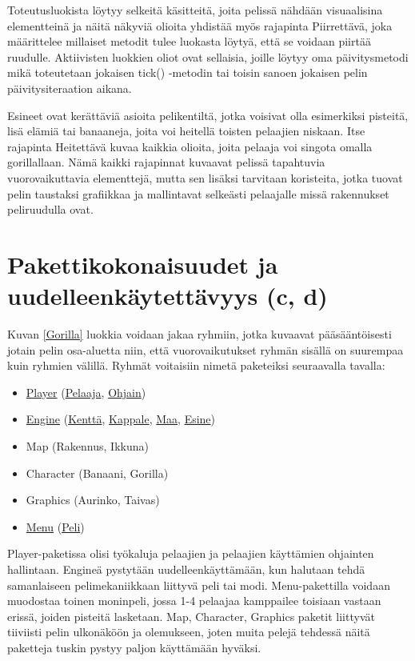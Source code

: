 Toteutusluokista löytyy selkeitä käsitteitä, joita pelissä nähdään visuaalisina
elementteinä ja näitä näkyviä olioita yhdistää myös rajapinta Piirrettävä, joka
määrittelee millaiset metodit tulee luokasta löytyä, että se voidaan piirtää
ruudulle. Aktiivisten luokkien oliot ovat sellaisia, joille löytyy oma
päivitysmetodi mikä toteutetaan jokaisen tick() -metodin tai toisin sanoen
jokaisen pelin päivitysiteraation aikana. 

Esineet ovat kerättäviä asioita pelikentiltä, jotka voisivat olla esimerkiksi
pisteitä, lisä elämiä tai banaaneja, joita voi heitellä toisten pelaajien niskaan. Itse rajapinta
Heitettävä kuvaa kaikkia olioita, joita pelaaja voi singota omalla gorillallaan.
Nämä kaikki rajapinnat kuvaavat pelissä tapahtuvia vuorovaikuttavia elementtejä,
mutta sen lisäksi tarvitaan koristeita, jotka tuovat pelin taustaksi grafiikkaa
ja mallintavat selkeästi pelaajalle missä rakennukset peliruudulla ovat.

\section{Pakettikokonaisuudet ja uudelleenkäytettävyys (c, d)}

\label{Pakettikokonaisuudet ja uudelleenkäytettävyys (c, d)}

Kuvan \ref{Gorilla} luokkia voidaan jakaa ryhmiin, jotka kuvaavat
pääsääntöisesti jotain pelin osa-aluetta niin, että vuorovaikutukset ryhmän
sisällä on suurempaa kuin ryhmien välillä. Ryhmät voitaisiin nimetä paketeiksi
seuraavalla tavalla:

\begin{itemize}
\item \underline{Player} (\underline{Pelaaja}, \underline{Ohjain})
\item \underline{Engine} (\underline{Kenttä}, \underline{Kappale},
\underline{Maa}, \underline{Esine})
\item Map (Rakennus, Ikkuna)
\item Character (Banaani, Gorilla)
\item Graphics (Aurinko, Taivas)
\item \underline{Menu} (\underline{Peli})
\end{itemize}

Player-paketissa olisi työkaluja pelaajien ja pelaajien käyttämien ohjainten
hallintaan. Engineä pystytään uudelleenkäyttämään, kun halutaan tehdä
samanlaiseen pelimekaniikkaan liittyvä peli tai modi. Menu-pakettilla voidaan
muodostaa toinen moninpeli, jossa 1-4 pelaajaa kamppailee toisiaan vastaan
erissä, joiden pisteitä lasketaan. Map, Character, Graphics paketit liittyvät
tiiviisti pelin ulkonäköön ja olemukseen, joten muita pelejä tehdessä näitä
paketteja tuskin pystyy paljon käyttämään hyväksi.

